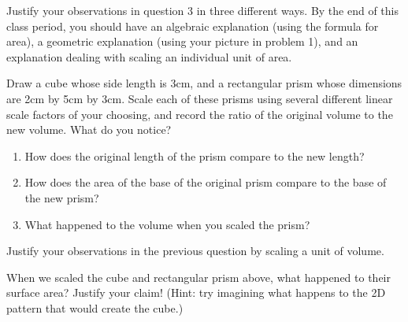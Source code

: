 \documentclass[nooutcomes,noauthor, handout]{ximera}
\begin{document}
\begin{problem}
Justify your observations in question 3 in three different ways.  By the end of this class period, you should have an algebraic explanation (using the formula for area), a geometric explanation (using your picture in problem 1), and an explanation dealing with scaling an individual unit of area.

\end{problem}


\newpage

\begin{problem}
Draw a cube whose side length is 3cm, and a rectangular prism whose dimensions are 2cm by 5cm by 3cm.  Scale each of these prisms using several different linear scale factors of your choosing, and record the ratio of the original volume to the new volume.  What do you notice?
\vskip 2.3in
\begin{enumerate}
    \item How does the original length of the prism compare to the new length?
    \item How does the area of the base of the original prism compare to the base of the new prism?
    \item What happened to the volume when you scaled the prism?
\end{enumerate}

\end{problem}




\begin{problem}
Justify your observations in the previous question by scaling a unit of volume.

\end{problem}



\begin{problem}
When we scaled the cube and rectangular prism above, what happened to their surface area?  Justify your claim! (Hint: try imagining what happens to the 2D pattern that would create the cube.)


\end{problem}


\newpage
\end{document}
